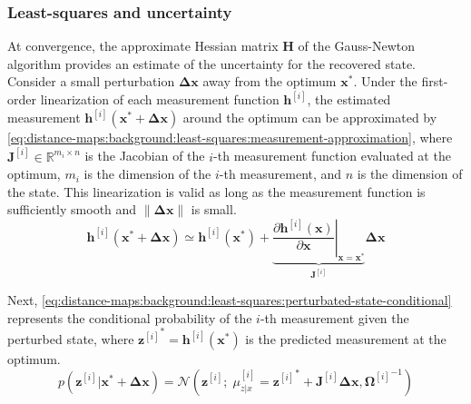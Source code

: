 

\subsubsection{Least-squares and uncertainty}
\label{sec:distance-maps:background:least-squares:uncertainty}

At convergence, the approximate Hessian matrix $\mathbf{H}$ of the Gauss-Newton
algorithm provides an estimate of the uncertainty for the recovered state.
Consider a small perturbation $\mathbf{\Delta x}$ away from
the optimum $\mathbf{x}^*$.
Under the first-order linearization of each measurement function
$\mathbf{h}^{[i]}$, the estimated measurement
$\mathbf{h}^{[i]}\!\left(\mathbf{x}^*+\mathbf{\Delta x}\right)$ around the optimum
can be approximated by
\eqref{eq:distance-maps:background:least-squares:measurement-approximation},
where $\mathbf{J}^{[i]}\in\mathbb{R}^{m_i \times n}$ is the
Jacobian of the $i$-th measurement function evaluated at the optimum,
$m_i$ is the dimension of the $i$-th measurement, and
$n$ is the dimension of the state.
This linearization is valid as long as the measurement function is
sufficiently smooth and $\|\mathbf{\Delta x}\|$ is small.
\begin{equation}
\label{eq:distance-maps:background:least-squares:measurement-approximation}
\mathbf{h}^{[i]}\!\left(\mathbf{x}^* + \mathbf{\Delta x}\right)
\simeq
\mathbf{h}^{[i]}\!\left(\mathbf{x}^*\right)
+
\underbrace{
  \left.
    \frac{\partial \mathbf{h}^{[i]}(\mathbf{x})}{\partial \mathbf{x}}
  \right|_{\mathbf{x}=\mathbf{x}^*}
}_{\mathbf{J}^{[i]}}
\mathbf{\Delta x}
\end{equation}

Next,
\eqref{eq:distance-maps:background:least-squares:perturbated-state-conditional}
represents the conditional probability of the $i$-th measurement given the
perturbed state, where ${\mathbf{z}^{[i]}}^* = \mathbf{h}^{[i]}(\mathbf{x}^*)$
is the predicted measurement at the optimum.
\begin{equation}
\label{eq:distance-maps:background:least-squares:perturbated-state-conditional}
p(\mathbf{z}^{[i]}|\mathbf{x}^* + \mathbf{\Delta x})
= \mathcal{N}\!\left(
    \mathbf{z}^{[i]};\;
    \mu_{z|x}^{[i]}={\mathbf{z}^{[i]}}^* + \mathbf{J}^{[i]}\mathbf{\Delta x},
    {\mathbf{\Omega}^{[i]}}^{-1}
  \right)
\end{equation}

